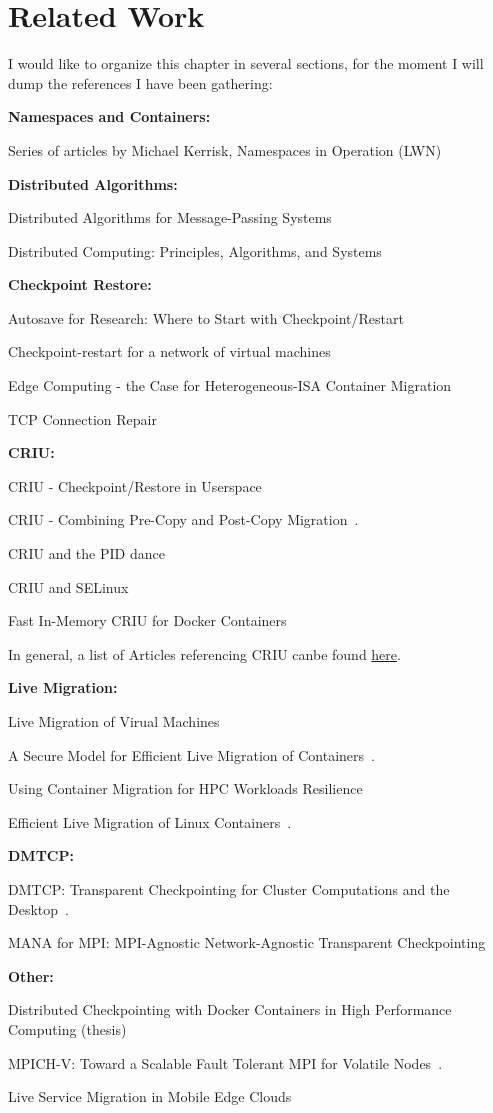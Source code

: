 \chapter{Related Work} \label{chap:related-work}

I would like to organize this chapter in several sections, for the moment I will dump the references I have been gathering:

\textbf{Namespaces and Containers:}

Series of articles by Michael Kerrisk, Namespaces in Operation (LWN)~\cite{Kerrisk2013}

\textbf{Distributed Algorithms:}

Distributed Algorithms for Message-Passing Systems~\cite{Raynal2013}

Distributed Computing: Principles, Algorithms, and Systems~\cite{Kshemkalyani2008}

\textbf{Checkpoint Restore:}

Autosave for Research: Where to Start with Checkpoint/Restart~\cite{Barker2014}

Checkpoint-restart for a network of virtual machines~\cite{Garg2013}

Edge Computing - the Case for Heterogeneous-ISA Container Migration~\cite{Barbalace2020}

TCP Connection Repair~\cite{Corbet12}

\textbf{CRIU:}

CRIU - Checkpoint/Restore in Userspace~\cite{Reber2016}

CRIU - Combining Pre-Copy and Post-Copy Migration~\cite{Reber2016b}.

CRIU and the PID dance~\cite{Reber2019}

CRIU and SELinux~\cite{Reber2019b}

Fast In-Memory CRIU for Docker Containers~\cite{Venkatesh2019}

In general, a list of Articles referencing CRIU canbe found \href{https://criu.org/Articles}{here}.

\textbf{Live Migration:}

Live Migration of Virual Machines~\cite{Clark2005}

A Secure Model for Efficient Live Migration of Containers~\cite{Mavus2019}.

Using Container Migration for HPC Workloads Resilience~\cite{Sindi2019}

Efficient Live Migration of Linux Containers~\cite{Stoyanov2018}.

\textbf{DMTCP:}

DMTCP: Transparent Checkpointing for Cluster Computations and the Desktop~\cite{Ansel2009}.

MANA for MPI: MPI-Agnostic Network-Agnostic Transparent Checkpointing~\cite{Garg2019}

\textbf{Other:}

Distributed Checkpointing with Docker Containers in High Performance Computing (thesis)~\cite{Berg2017}

MPICH-V: Toward a Scalable Fault Tolerant MPI for Volatile Nodes~\cite{Bosilca2002}.

Live Service Migration in Mobile Edge Clouds~\cite{Machen2018}
